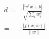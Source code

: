 \documentclass[../main.tex]{subfiles}
\begin{document}
\begin{align*}
d
= & \frac{| w^T x + b |}{\sqrt{\sum_i w_i^2}} \\
= & \frac{| f(x, w) |}{\| w \|}
\end{align*}
\end{document}
